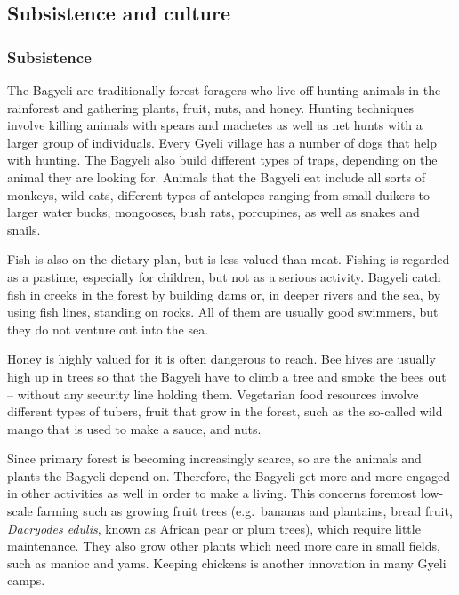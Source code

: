


\subsection{Subsistence and culture}
\label{sec:Cult}


\subsubsection*{Subsistence} The Bagyeli are traditionally forest foragers who live off hunting animals in the rainforest and gathering plants, fruit, nuts, and honey. Hunting techniques involve killing animals with spears and machetes as well as net hunts with a larger group of individuals. Every Gyeli village has a number of dogs that help with hunting. The Bagyeli also build different types of traps, depending on the animal they are looking for. Animals that the Bagyeli eat include all sorts of monkeys, wild cats, different types of antelopes ranging from small duikers to larger water bucks, mongooses, bush rats, porcupines, as well as snakes and snails.

Fish is also on the dietary plan, but is less valued than meat. Fishing is regarded as a pastime, especially for children, but not as a serious activity. Bagyeli catch fish in creeks in the forest by building dams or, in deeper rivers and the sea, by using fish lines, standing on rocks. All of them are usually good swimmers, but they do not venture out into the sea.

Honey is highly valued for it is often dangerous to reach. Bee hives are usually high up in trees so that the Bagyeli have to climb a tree and smoke the bees out -- without any security line holding them.
Vegetarian food resources involve different types of tubers, fruit that grow in the forest, such as the so-called wild mango that is used to make a sauce, and nuts. 

Since primary forest is becoming increasingly scarce, so are the animals and plants the Bagyeli depend on. Therefore, the Bagyeli get more and more engaged in other activities as well in order to make a living.  This concerns foremost low-scale farming such as growing fruit trees (e.g.\ bananas and plantains, bread fruit, {\itshape Dacryodes edulis}, known as African pear or plum trees), which require little maintenance. They also grow other plants which need more care in small fields, such as manioc and yams. Keeping chickens is another innovation in many Gyeli camps.

